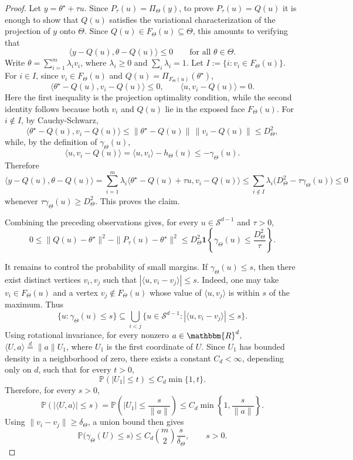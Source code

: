 \documentclass[10pt,a4paper]{amsart}
\newcommand{\R}{\mathbbm{R}}
\newcommand{\mcS}{\mathcal{S}}
\renewcommand{\P}{\mathbb{P}}
\begin{document}
\begin{proof}
Let $y=\theta^\star+\tau u$. Since $P_\tau(u)=\Pi_\Theta(y)$, to prove $P_\tau(u)=Q(u)$ it is enough
to show that $Q(u)$ satisfies the variational characterization of the
projection of $y$ onto $\Theta$. Since $Q(u)\in F_\Theta(u)\subseteq\Theta$,
this amounts to verifying that
\[
    \langle y-Q(u),\theta-Q(u)\rangle\le0
    \qquad
    \text{for all }\theta\in\Theta.
\]
Write $\theta=\sum_{i=1}^m\lambda_i v_i$, where
$\lambda_i\ge0$ and $\sum_i\lambda_i=1$. Let $I:=\{i:v_i\in F_\Theta(u)\}$. For $i\in I$, since $v_i\in F_\Theta(u)$ and
$Q(u)=\Pi_{F_\Theta(u)}(\theta^\star)$,
\[
    \langle \theta^\star-Q(u),v_i-Q(u)\rangle\le0,
    \qquad
    \langle u,v_i-Q(u)\rangle=0.
\]
Here the first inequality is the projection optimality condition, while the
second identity follows because both $v_i$ and $Q(u)$ lie in the exposed
face $F_\Theta(u)$. 
For $i\notin I$, by Cauchy-Schwarz,
\[
    \langle \theta^\star-Q(u),v_i-Q(u)\rangle
    \le
    \|\theta^\star-Q(u)\|\,\|v_i-Q(u)\|
    \le
    D_{\Theta}^2,
\]
while, by the definition of $\gamma_\Theta(u)$,
\[
    \langle u,v_i-Q(u)\rangle
    =
    \langle u,v_i\rangle-h_\Theta(u)
    \le
    -\gamma_\Theta(u).
\]
Therefore
\[
    \langle y-Q(u),\theta-Q(u)\rangle
    =
    \sum_{i=1}^m
    \lambda_i
    \langle \theta^\star-Q(u)+\tau u,v_i-Q(u)\rangle
    \le
    \sum_{i\notin I}
    \lambda_i
    \bigl(D_{\Theta}^2-\tau\gamma_\Theta(u)\bigr)
    \le0
\]
whenever $\tau\gamma_\Theta(u)\ge D_{\Theta}^2$. This proves the claim.

Combining the preceding observations gives, for every $u\in\mcS^{d-1}$
and $\tau>0$,
\[
    0
    \le
    \|Q(u)-\theta^\star\|^2
    -
    \|P_\tau(u)-\theta^\star\|^2
    \le
    D_{\Theta}^2
    \mathbf 1
    \left\{
        \gamma_\Theta(u)
        \le
        \frac{D_{\Theta}^2}{\tau}
    \right\}.
\]

It remains to control the probability of small margins. If
$\gamma_\Theta(u)\le s$, then there exist distinct vertices $v_i,v_j$ such
that $|\langle u,v_i-v_j\rangle|\le s$. Indeed, one may take $v_i\in F_\Theta(u)$ and a vertex $v_j\notin F_\Theta(u)$
whose value of $\langle u,v_j\rangle$ is within $s$ of the maximum. Thus
\[
    \{u:\gamma_\Theta(u)\le s\}
    \subseteq
    \bigcup_{i<j}
    \{
        u\in\mcS^{d-1}:
        |\langle u,v_i-v_j\rangle|\le s
    \}.
\]
Using rotational invariance, for every nonzero $a\in\R^d$, $\langle U,a\rangle
\stackrel{d}{=}\|a\|U_1$,
where $U_1$ is the first coordinate of $U$. Since $U_1$ has bounded density in a neighborhood of zero, there exists a constant $C_d<\infty$, depending only on $d$, such that for every $t>0$,
\[
    \P(|U_1|\le t)\le C_d\min\{1,t\}.
\]
Therefore, for every $s>0$,
\[
    \P(|\langle U,a\rangle|\le s)
    =
    \P\left(|U_1|\le \frac{s}{\|a\|}\right)
    \le
    C_d\min\left\{1,\frac{s}{\|a\|}\right\}.
\]
Using $\|v_i-v_j\| \ge \delta_{\Theta}$, a union bound then gives
\[
    \P\bigl(\gamma_\Theta(U)\le s\bigr)
    \le
    C_d \binom{m}{2}\frac{s}{\delta_\Theta},
    \qquad s>0.
\]


\end{proof}
\end{document}

